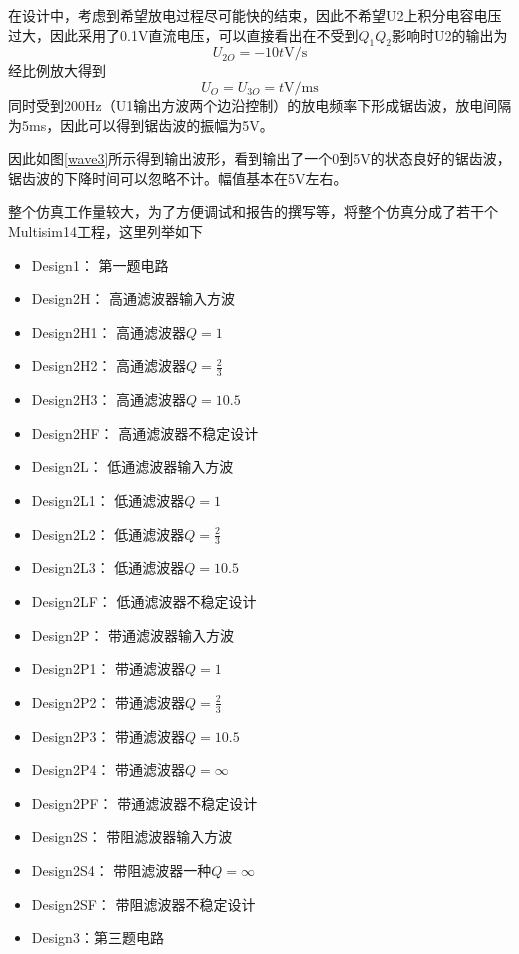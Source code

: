 \documentclass[UTF8,a4paper]{paper}
\begin{document}
在设计中，考虑到希望放电过程尽可能快的结束，因此不希望U2上积分电容电压过大，因此采用了0.1V直流电压，可以直接看出在不受到$Q_1Q_2$影响时U2的输出为
$$U_{2O}=-10t\mathrm{V/s}$$
经比例放大得到
$$U_O=U_{3O}=t\mathrm{V/ms}$$
同时受到200Hz（U1输出方波两个边沿控制）的放电频率下形成锯齿波，放电间隔为5ms，因此可以得到锯齿波的振幅为5V。

因此如图\ref{wave3}所示得到输出波形，看到输出了一个0到5V的状态良好的锯齿波，锯齿波的下降时间可以忽略不计。幅值基本在5V左右。

\appendixpage
整个仿真工作量较大，为了方便调试和报告的撰写等，将整个仿真分成了若干个Multisim14工程，这里列举如下
\begin{multicols}{2}
\begin{itemize}
\item Design1： 第一题电路 
\item Design2H： 高通滤波器输入方波 
\item Design2H1： 高通滤波器$Q=1$ 
\item Design2H2： 高通滤波器$Q=\frac{2}{3}$ 
\item Design2H3： 高通滤波器$Q=10.5$ 
\item Design2HF： 高通滤波器不稳定设计
\item Design2L： 低通滤波器输入方波 
\item Design2L1： 低通滤波器$Q=1$ 
\item Design2L2： 低通滤波器$Q=\frac{2}{3}$ 
\item Design2L3： 低通滤波器$Q=10.5$ 
\item Design2LF： 低通滤波器不稳定设计
\item Design2P： 带通滤波器输入方波 
\item Design2P1： 带通滤波器$Q=1$ 
\item Design2P2： 带通滤波器$Q=\frac{2}{3}$ 
\item Design2P3： 带通滤波器$Q=10.5$ 
\item Design2P4： 带通滤波器$Q=\infty$ 
\item Design2PF： 带通滤波器不稳定设计
\item Design2S： 带阻滤波器输入方波 
\item Design2S4： 带阻滤波器一种$Q=\infty$ 
\item Design2SF： 带阻滤波器不稳定设计
\item Design3：第三题电路 
\end{itemize}
\end{multicols}
\end{document}
